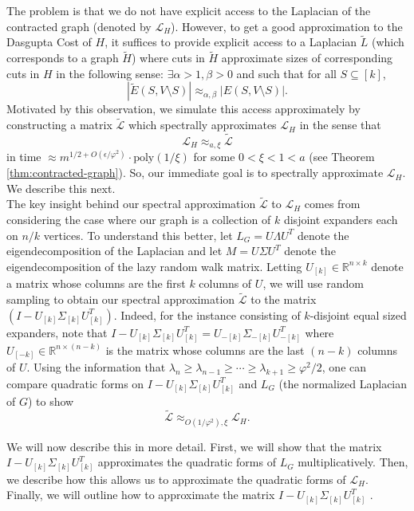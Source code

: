 \documentclass[letterpaper,11pt]{article}
\newcommand{\cL}{\mathcal{L}}
\newcommand{\R}{\mathbb{R}}
\theoremstyle{plain}
\theoremstyle{definition}
\theoremstyle{remark}
\newcommand{\e}{\epsilon}
\newcommand{\wt}[1]{\widetilde{#1}}
\begin{document}
The problem is that we do not have explicit access to the Laplacian of the contracted graph (denoted by $\cL_H$).
However, to get a good approximation to the Dasgupta Cost of $H$,
it suffices to provide explicit access to a Laplacian $\wt{L}$ (which corresponds to a graph $\wt{H}$) 
where cuts in $\wt{H}$ approximate sizes of corresponding cuts in $H$ in the following sense: 
$\exists \alpha > 1, \beta>0$ and such that for all $S \subseteq [k]$, 
$$
 |\widetilde{E}(S,V\setminus S)| \approx_{\alpha, \beta} |E(S,V\setminus S)|. 
$$
Motivated by this observation, we simulate this access approximately  
 by constructing a matrix $\widetilde{\cL}$ which spectrally approximates $\cL_H$ in the sense that
\begin{equation}
\label{eq:l-lh-spec}
\cL_H \approx_{a, \xi} \widetilde{\cL} 
\end{equation}
in time $\approx m^{1/2+O(\e/\varphi^2)} \cdot \text{poly}(1/\xi)$ for some $0<\xi<1<a$ (see Theorem \ref{thm:contracted-graph}).
So, our immediate goal is to spectrally approximate $\cL_H$. We describe this next. \\

\vspace{-5pt}
\noindent {\bf Spectrally approximating $\cL_H$:} The key insight behind our spectral approximation $\widetilde{\cL}$ to $\cL_H$ comes from considering the case where our graph is a collection of $k$ disjoint expanders each on $n/k$ vertices. To understand this better, let $L_G = U \Lambda U^T$ denote the eigendecomposition of the Laplacian and let $M = U \Sigma U^T$ denote the eigendecomposition of the lazy random walk matrix. Letting $U_{[k]} \in \R^{n \times k}$ denote a matrix whose columns are the first $k$ columns of $U$, we will use random sampling to obtain our spectral approximation $\widetilde{\cL}$ to the matrix $(I - U_{[k]} \Sigma_{[k]} U_{[k]}^T)$. Indeed, for the instance consisting of $k$-disjoint equal sized expanders, note that $I - U_{[k]} \Sigma_{[k]} U_{[k]}^T = U_{-[k]} \Sigma_{-[k]} U_{-[k]}^T$ where $U_{[-k]} \in \R^{n \times (n-k)}$ is the matrix whose columns are the last $(n-k)$ columns of $U$. Using the information that $\lambda_n \geq \lambda_{n-1} \geq \cdots \geq \lambda_{k+1} \geq \varphi^2/2$, one can compare quadratic forms on $I - U_{[k]} \Sigma_{[k]} U_{[k]}^T$ and $L_G$ (the normalized Laplacian of $G$) to show
$$ \wt{\cL}\approx_{O(1/\varphi^2), \xi} \cL_H. $$ 

We will now describe this in more detail. First, we will show that the matrix $I - U_{[k]} \Sigma_{[k]} U_{[k]}^T$ approximates the quadratic forms of $L_G$ multiplicatively. Then, we describe how this allows us to approximate the quadratic forms of $\mathcal{L}_H$. Finally, we will outline how to approximate the matrix $I - U_{[k]} \Sigma_{[k]} U_{[k]}^T$ . 
\end{document}

